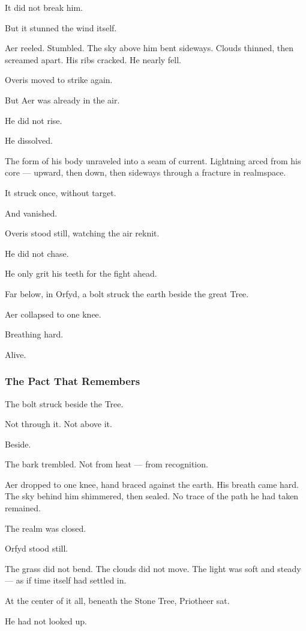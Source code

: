 \documentclass[12pt]{article}
\begin{document}
It did not break him.

But it stunned the wind itself.

Aer reeled. Stumbled. The sky above him bent sideways. Clouds thinned, then screamed apart. His ribs cracked. He nearly fell.

Overis moved to strike again.

But Aer was already in the air.

He did not rise.

He dissolved.

The form of his body unraveled into a seam of current. Lightning arced from his core — upward, then down, then sideways through a fracture in realmspace.

It struck once, without target.

And vanished.

Overis stood still, watching the air reknit.

He did not chase.

He only grit his teeth for the fight ahead.

Far below, in Orfyd, a bolt struck the earth beside the great Tree.

Aer collapsed to one knee.

Breathing hard.

Alive.


\dotfill

\subsubsection{The Pact That Remembers}

The bolt struck beside the Tree.

Not through it. Not above it.

Beside.

The bark trembled. Not from heat — from recognition.

Aer dropped to one knee, hand braced against the earth. His breath came hard. The sky behind him shimmered, then sealed. No trace of the path he had taken remained.

The realm was closed.

Orfyd stood still.

The grass did not bend. The clouds did not move. The light was soft and steady — as if time itself had settled in.

At the center of it all, beneath the Stone Tree, Priotheer sat.

He had not looked up.
\end{document}

